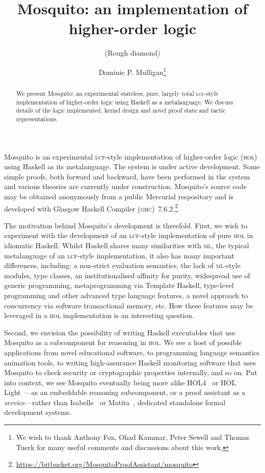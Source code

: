 \documentclass{llncs}
\author{Dominic P. Mulligan\thanks{We wish to thank Anthony Fox, Ohad Kammar, Peter Sewell and Thomas Tuerk for many useful comments and discussions about this work.}}
\title{Mosquito: an implementation of higher-order logic}
\subtitle{(Rough diamond)}
\institute{Computer Laboratory, University of Cambridge}
\newcommand{\mosquito}{Mosquito\xspace}
\begin{document}
\maketitle

\begin{abstract}
We present \mosquito: an experimental stateless, pure, largely total \textsc{lcf}-style implementation of higher-order logic using Haskell as a metalanguage.
We discuss details of the logic implemented, kernel design and novel proof state and tactic representations.
\end{abstract}

\mosquito is an experimental \textsc{lcf}-style implementation of higher-order logic (\textsc{hol}) using Haskell as its metalanguage.
The system is under active development.
Some simple proofs, both forward and backward, have been performed in the system and various theories are currently under construction.
\mosquito's source code may be obtained anonymously from a public Mercurial respository and is developed with Glasgow Haskell Compiler (\textsc{ghc})~7.6.2.\footnote{\url{https://bitbucket.org/MosquitoProofAssistant/mosquito}}

The motivation behind \mosquito's development is threefold.
First, we wish to experiment with the development of an \textsc{lcf}-style implementation of pure \textsc{hol} in idiomatic Haskell.
Whilst Haskell shares many similarities with \textsc{ml}, the typical metalanguage of an \textsc{lcf}-style implementation, it also has many important differences, including: a non-strict evaluation semantics, the lack of \textsc{ml}-style modules, type classes, an institutionalised affinity for purity, widespread use of generic programming, metaprogramming via Template Haskell, type-level programming and other advanced type language features, a novel approach to concurrency via software transactional memory, etc.
How these features may be leveraged in a \textsc{hol} implementation is an interesting question.

Second, we envision the possibility of writing Haskell executables that use \mosquito as a subcomponent for reasoning in \textsc{hol}.
We see a host of possible applications from novel educational software, to programming language semantics animation tools, to writing high-assurance Haskell monitoring software that uses \mosquito to check security or cryptographic properties internally, and so on.
Put into context, we see \mosquito eventually being more alike HOL4~\cite{gordon:introduction:1993} or HOL Light~\cite{harrison:hol:2009}---as an embeddable reasoning subcomponent, or a proof assistant as a \emph{service}---rather than Isabelle~\cite{wenzel:isabelle:2008} or Matita~\cite{asperti:matita:2011}, dedicated standalone formal development systems.
\end{document}
